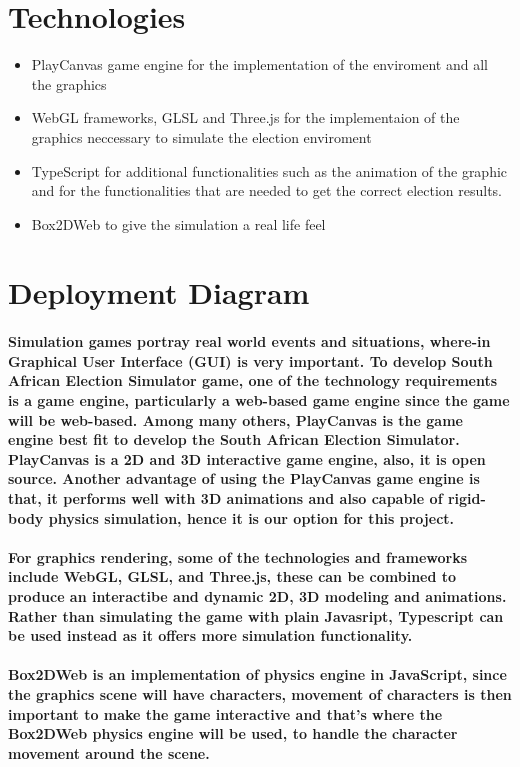 \documentclass{article}
\begin{document}
\section{Technologies}
\begin{itemize}
	\item PlayCanvas game engine for the implementation of the enviroment and all the graphics 
	\item WebGL frameworks, GLSL and Three.js for the implementaion of the graphics neccessary to simulate the election enviroment 
	\item TypeScript for additional functionalities such as the animation of the graphic and for the functionalities that are needed to get the correct election results.
	\item Box2DWeb to give the simulation a real life feel 
\end{itemize}

\section{Deployment Diagram}

\paragraph{Simulation games  portray real world events and situations, where-in Graphical User Interface (GUI) is very important. To develop South African
Election Simulator game, one of the technology requirements is a game engine, particularly a web-based game engine since the game will be web-based. Among 
many others, PlayCanvas is the game engine best fit to develop the South African Election Simulator. PlayCanvas is a 2D and 3D interactive game engine, also, 
it is open source. Another advantage of using the PlayCanvas game engine is that, it performs well with 3D animations and also capable of rigid-body physics simulation,  hence it is our option for this project.}

\paragraph{For graphics rendering, some of the technologies and frameworks include WebGL, GLSL, and Three.js, these can be combined to produce an interactibe and dynamic 2D, 3D modeling and animations.
Rather than simulating the game with plain Javasript, Typescript can be used instead as it offers more simulation functionality.}

\paragraph{Box2DWeb is an implementation of physics engine in JavaScript, since the graphics scene will have characters, movement of characters is
then important to make the game interactive and that's where the Box2DWeb physics engine will be used, to handle the character movement around the scene.}
\end{document}

